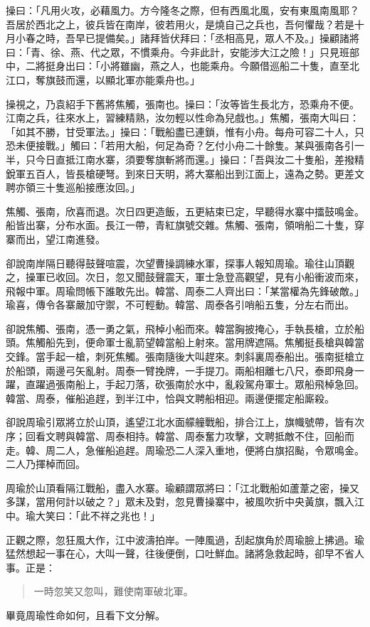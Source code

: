 操曰：「凡用火攻，必藉風力。方今隆冬之際，但有西風北風，安有東風南風耶？吾居於西北之上，彼兵皆在南岸，彼若用火，是燒自己之兵也，吾何懼哉？若是十月小春之時，吾早已提備矣。」諸拜皆伏拜曰：「丞相高見，眾人不及。」操顧諸將曰：「青、徐、燕、代之眾，不慣乘舟。今非此計，安能涉大江之險！」只見班部中，二將挺身出曰：「小將雖幽，燕之人，也能乘舟。今願借巡船二十隻，直至北江口，奪旗鼓而還，以顯北軍亦能乘舟也。」

操視之，乃袁紹手下舊將焦觸，張南也。操曰：「汝等皆生長北方，恐乘舟不便。江南之兵，往來水上，習練精熟，汝勿輕以性命為兒戲也。」焦觸，張南大叫曰：「如其不勝，甘受軍法。」操曰：「戰船盡已連鎖，惟有小舟。每舟可容二十人，只恐未便接戰。」觸曰：「若用大船，何足為奇？乞付小舟二十餘隻。某與張南各引一半，只今日直抵江南水寨，須要奪旗斬將而還。」操曰：「吾與汝二十隻船，差撥精銳軍五百人，皆長槍硬弩。到來日天明，將大寨船出到江面上，遠為之勢。更差文聘亦領三十隻巡船接應汝回。」

焦觸、張南，欣喜而退。次日四更造飯，五更結束已定，早聽得水寨中擂鼓鳴金。船皆出寨，分布水面。長江一帶，青紅旗號交雜。焦觸、張南，領哨船二十隻，穿寨而出，望江南進發。

卻說南岸隔日聽得鼓聲喧震，次望曹操調練水軍，探事人報知周瑜。瑜往山頂觀之，操軍已收回。次日，忽又聞鼓聲震天，軍士急登高觀望，見有小船衝波而來，飛報中軍。周瑜問帳下誰敢先出。韓當、周泰二人齊出曰：「某當權為先鋒破敵。」瑜喜，傳令各寨嚴加守禦，不可輕動。韓當、周泰各引哨船五隻，分左右而出。

卻說焦觸、張南，憑一勇之氣，飛棹小船而來。韓當胸披掩心，手執長槍，立於船頭。焦觸船先到，便命軍士亂箭望韓當船上射來。當用牌遮隔。焦觸挺長槍與韓當交鋒。當手起一槍，刺死焦觸。張南隨後大叫趕來。刺斜裏周泰船出。張南挺槍立於船頭，兩邊弓矢亂射。周泰一臂挽牌，一手提刀。兩船相離七八尺，泰即飛身一躍，直躍過張南船上，手起刀落，砍張南於水中，亂殺駕舟軍士。眾船飛棹急回。韓當、周泰，催船追趕，到半江中，恰與文聘船相迎。兩邊便擺定船廝殺。

卻說周瑜引眾將立於山頂，遙望江北水面艨艟戰船，排合江上，旗幟號帶，皆有次序；回看文聘與韓當、周泰相持。韓當、周泰奮力攻擊，文聘抵敵不住，回船而走。韓、周二人，急催船追趕。周瑜恐二人深入重地，便將白旗招颭，令眾鳴金。二人乃揮棹而回。

周瑜於山頂看隔江戰船，盡入水寨。瑜顧謂眾將曰：「江北戰船如蘆葦之密，操又多謀，當用何計以破之？」眾未及對，忽見曹操寨中，被風吹折中央黃旗，飄入江中。瑜大笑曰：「此不祥之兆也！」

正觀之際，忽狂風大作，江中波濤拍岸。一陣風過，刮起旗角於周瑜臉上拂過。瑜猛然想起一事在心，大叫一聲，往後便倒，口吐鮮血。諸將急救起時，卻早不省人事。正是：

\begin{quote}
一時忽笑又忽叫，難使南軍破北軍。
\end{quote}

畢竟周瑜性命如何，且看下文分解。
